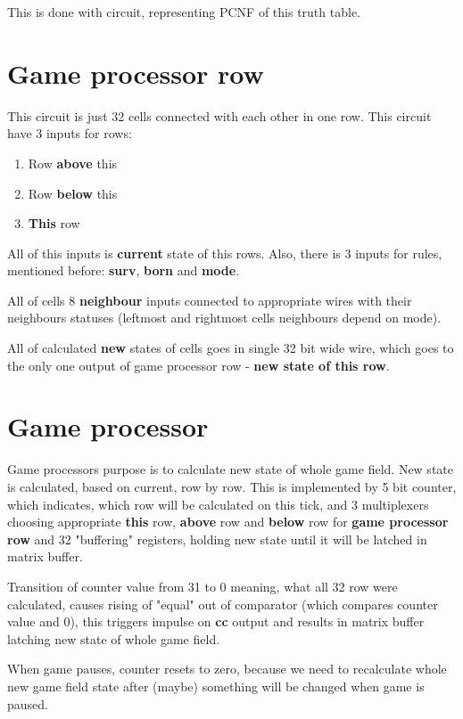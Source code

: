 This is done with circuit, representing PCNF of this truth table.

\section*{Game processor row}

This circuit is just 32 cells connected with each other in one row. This circuit have 3 inputs for rows:

\begin{enumerate}
	\item Row \textbf{above} this
	\item Row \textbf{below} this
	\item \textbf{This} row
\end{enumerate}

All of this inputs is \textbf{current} state of this rows.
Also, there is 3 inputs for rules, mentioned before: \textbf{surv}, \textbf{born} and \textbf{mode}.

All of cells 8 \textbf{neighbour} inputs connected to appropriate wires with their neighbours statuses (leftmost and rightmost cells neighbours depend on mode).

All of calculated \textbf{new} states of cells goes in single 32 bit wide wire, which goes to the only one output of game processor row - \textbf{new state of this row}.

\section*{Game processor}

Game processors purpose is to calculate new state of whole game field. New state is calculated, based on current, row by row. This is implemented by 5 bit counter, which indicates, which row will be calculated on this tick, and 3 multiplexers choosing appropriate \textbf{this} row, \textbf{above} row and \textbf{below} row for \textbf{game processor row} and 32 "buffering" registers, holding new state until it will be latched in matrix buffer.

Transition of counter value from 31 to 0 meaning, what all 32 row were calculated, causes rising of "equal" out of comparator (which compares counter value and 0), this triggers impulse on \textbf{cc} output and results in matrix buffer latching new state of whole game field.

When game pauses, counter resets to zero, because we need to recalculate whole new game field state after (maybe) something will be changed when game is paused. 

